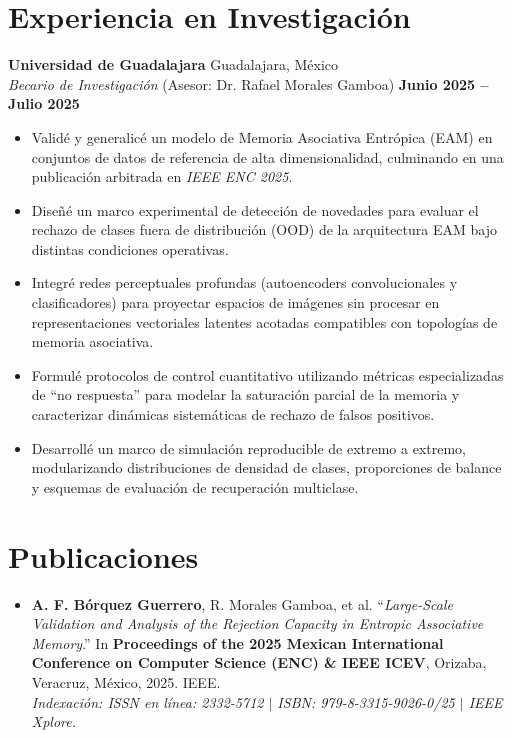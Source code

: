 \documentclass[11pt]{article}
\begin{document}
\section*{Experiencia en Investigación}
\textbf{Universidad de Guadalajara} \hfill Guadalajara, México \\
\textit{Becario de Investigación} (Asesor: Dr. Rafael Morales Gamboa) \hfill \textbf{Junio 2025 -- Julio 2025}
\vspace{-0.3cm}
\begin{itemize}[leftmargin=*]
    \item Validé y generalicé un modelo de Memoria Asociativa Entrópica (EAM) en conjuntos de datos de referencia de alta dimensionalidad, culminando en una publicación arbitrada en \textit{IEEE ENC 2025}.

    \vspace{-0.3cm}
    \item Diseñé un marco experimental de detección de novedades para evaluar el rechazo de clases fuera de distribución (OOD) de la arquitectura EAM bajo distintas condiciones operativas.

    \vspace{-0.3cm}
    \item Integré redes perceptuales profundas (autoencoders convolucionales y clasificadores) para proyectar espacios de imágenes sin procesar en representaciones vectoriales latentes acotadas compatibles con topologías de memoria asociativa.

    \vspace{-0.3cm}
    \item Formulé protocolos de control cuantitativo utilizando métricas especializadas de ``no respuesta'' para modelar la saturación parcial de la memoria y caracterizar dinámicas sistemáticas de rechazo de falsos positivos.

    \vspace{-0.3cm}
    \item Desarrollé un marco de simulación reproducible de extremo a extremo, modularizando distribuciones de densidad de clases, proporciones de balance y esquemas de evaluación de recuperación multiclase.
\end{itemize}


\section*{Publicaciones}
\begin{itemize}[leftmargin=*]
    \item \textbf{A. F. Bórquez Guerrero}, R. Morales Gamboa, et al. ``\textit{Large-Scale Validation and Analysis of the Rejection Capacity in Entropic Associative Memory}.'' In \textbf{Proceedings of the 2025 Mexican International Conference on Computer Science (ENC) \& IEEE ICEV}, Orizaba, Veracruz, México, 2025. IEEE. \\
    \footnotesize\textit{Indexación: ISSN en línea: 2332-5712 $\vert$ ISBN: 979-8-3315-9026-0/25 $\vert$ IEEE Xplore.}
\end{itemize}
\end{document}
